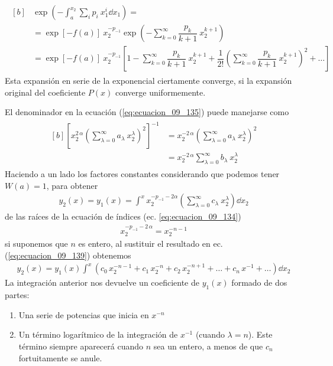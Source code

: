 \begin{align}
\begin{aligned}[b]
&{}\exp \left( - \int_{a}^{x_{2}} \sum_{i} p_{i} \: x_{1}^{i} \dd{x_{1}} \right) =  \\
&= \exp [ - f(a) ] \: x_{2}^{-p_{-1}} \exp \left( - \sum_{k=0}^{\infty} \dfrac{p_{k}}{k+1} \: x_{2}^{k+1} \right)  \\
&= \exp [ - f(a) ] \: x_{2}^{-p_{-1}} \left[ 1 - \sum_{k=0}^{\infty} \dfrac{p_{k}}{k+1} \: x_{2}^{k+1} + \dfrac{1}{2!} \left( \sum_{k=0}^{\infty} \dfrac{p_{k}}{k+1} \: x_{2}^{k+1} \right)^{2} + \ldots \right]
\end{aligned}
\label{eq:ecuacion_09_137}
\end{align}
Esta expansión en serie de la exponencial ciertamente converge, si la expansión original del coeficiente $P(x)$ converge uniformemente.
\par
El denominador en la ecuación (\ref{eq:ecuacion_09_135}) puede manejarse como
\begin{align}
\begin{aligned}[b]
\left[ x_{2}^{2 \, \alpha} \left( \sum_{\lambda=0}^{\infty} a_{\lambda} \: x_{2}^{\lambda} \right)^{2} \right]^{-1} &= x_{2}^{-2 \, \alpha} \left( \sum_{\lambda=0}^{\infty} a_{\lambda} \: x_{2}^{\lambda} \right)^{2}  \\
&= x_{2}^{-2 \, \alpha} \sum_{\lambda=0}^{\infty} b_{\lambda} \: x_{2}^{\lambda}
\end{aligned}
\label{eq:ecuacion_09_138}
\end{align}
Haciendo a un lado los factores constantes considerando que podemos tener $W(a) = 1$, para obtener
\begin{align}
y_{2}(x) =  y_{1}(x) = \int^{x} x_{2}^{-p_{-1}-2 \alpha} \left( \sum_{\lambda=0}^{\infty} c_{\lambda} \: x_{2}^{\lambda} \right) \dd{x_{2}} 
\label{eq:ecuacion_09_139}
\end{align}
de las raíces de la ecuación de índices (ec. \ref{eq:ecuacion_09_134})
\begin{align}
x_{2}^{-p_{-1} - 2 \, \alpha} = x_{2}^{-n-1}
\end{align}
si suponemos que $n$ es entero, al sustituir el resultado en ec. (\ref{eq:ecuacion_09_139}) obtenemos 
\begin{align}
y_{2}(x) = y_{1}(x) \int^{x} (c_{0} \, x_{2}^{-n-1} + c_{1} \, x_{2}^{-n} + c_{2} \, x_{2}^{-n+1} + \ldots + c_{n} \, x^{-1} + \ldots ) \dd{x_{2}}
\label{eq:ecuacion_09_141}
\end{align}
La integración anterior nos devuelve un coeficiente de $y_{1}(x)$ formado de dos partes:
\begin{enumerate}
\item Una serie de potencias que inicia en $x^{-n}$
\item Un término logarítmico de la integración de $x^{-1}$ (cuando $\lambda=n$). Este término siempre aparecerá cuando $n$ sea un entero, a menos de que $c_{n}$ fortuitamente se anule.
\end{enumerate}
